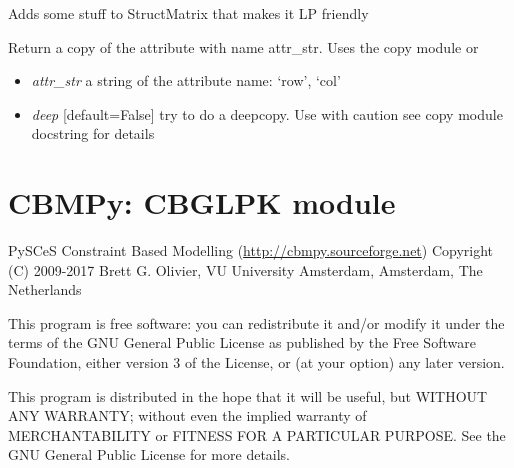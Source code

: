 \documentclass[a4paper,11pt,english]{sphinxmanual}
\begin{document}
\begin{fulllineitems}
\label{modules_doc:cbmpy.CBDataStruct.StructMatrixLP}
Adds some stuff to StructMatrix that makes it LP friendly

\begin{fulllineitems}
\label{modules_doc:cbmpy.CBDataStruct.StructMatrixLP.getCopy}
Return a copy of the attribute with name attr\_str. Uses the copy module  or 
\begin{itemize}
\item {} 
\emph{attr\_str} a string of the attribute name: `row', `col'

\item {} 
\emph{deep} {[}default=False{]} try to do a deepcopy. Use with caution see copy module docstring for details

\end{itemize}

\end{fulllineitems}


\end{fulllineitems}

\label{modules_doc:module-cbmpy.CBGLPK}

\section{CBMPy: CBGLPK module}
\label{modules_doc:cbmpy-cbglpk-module}
PySCeS Constraint Based Modelling (\url{http://cbmpy.sourceforge.net})
Copyright (C) 2009-2017 Brett G. Olivier, VU University Amsterdam, Amsterdam, The Netherlands

This program is free software: you can redistribute it and/or modify
it under the terms of the GNU General Public License as published by
the Free Software Foundation, either version 3 of the License, or
(at your option) any later version.

This program is distributed in the hope that it will be useful,
but WITHOUT ANY WARRANTY; without even the implied warranty of
MERCHANTABILITY or FITNESS FOR A PARTICULAR PURPOSE.  See the
GNU General Public License for more details.
\end{document}
